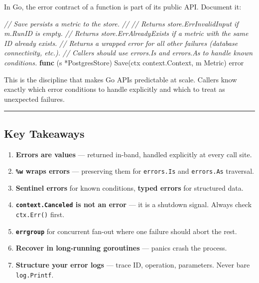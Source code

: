\documentclass[
]{article}
\newenvironment{Shaded}{}{}
\newcommand{\CommentTok}[1]{\textcolor[rgb]{0.38,0.63,0.69}{\textit{#1}}}
\newcommand{\DataTypeTok}[1]{\textcolor[rgb]{0.56,0.13,0.00}{#1}}
\newcommand{\KeywordTok}[1]{\textcolor[rgb]{0.00,0.44,0.13}{\textbf{#1}}}
\newcommand{\NormalTok}[1]{#1}
\newcommand{\OperatorTok}[1]{\textcolor[rgb]{0.40,0.40,0.40}{#1}}
\providecommand{\tightlist}{%
  \setlength{\itemsep}{0pt}\setlength{\parskip}{0pt}}
\begin{document}
In Go, the error contract of a function is part of its public API.
Document it:

\begin{Shaded}
\begin{Highlighting}[]
\CommentTok{// Save persists a metric to the store.}
\CommentTok{//}
\CommentTok{// Returns store.ErrInvalidInput if m.RunID is empty.}
\CommentTok{// Returns store.ErrAlreadyExists if a metric with the same ID already exists.}
\CommentTok{// Returns a wrapped error for all other failures (database connectivity, etc.).}
\CommentTok{// Callers should use errors.Is and errors.As to handle known conditions.}
\KeywordTok{func} \OperatorTok{(}\NormalTok{s }\OperatorTok{*}\NormalTok{PostgresStore}\OperatorTok{)}\NormalTok{ Save}\OperatorTok{(}\NormalTok{ctx context}\OperatorTok{.}\NormalTok{Context}\OperatorTok{,}\NormalTok{ m Metric}\OperatorTok{)} \DataTypeTok{error}
\end{Highlighting}
\end{Shaded}

This is the discipline that makes Go APIs predictable at scale. Callers
know exactly which error conditions to handle explicitly and which to
treat as unexpected failures.

\begin{center}\rule{0.5\linewidth}{0.5pt}\end{center}

\hypertarget{key-takeaways-3}{%
\subsection{Key Takeaways}\label{key-takeaways-3}}

\begin{enumerate}
\def\labelenumi{\arabic{enumi}.}
\tightlist
\item
  \textbf{Errors are values} --- returned in-band, handled explicitly at
  every call site.
\item
  \textbf{\texttt{\%w} wraps errors} --- preserving them for
  \texttt{errors.Is} and \texttt{errors.As} traversal.
\item
  \textbf{Sentinel errors} for known conditions, \textbf{typed errors}
  for structured data.
\item
  \textbf{\texttt{context.Canceled} is not an error} --- it is a
  shutdown signal. Always check \texttt{ctx.Err()} first.
\item
  \textbf{\texttt{errgroup}} for concurrent fan-out where one failure
  should abort the rest.
\item
  \textbf{Recover in long-running goroutines} --- panics crash the
  process.
\item
  \textbf{Structure your error logs} --- trace ID, operation,
  parameters. Never bare \texttt{log.Printf}.
\end{enumerate}
\end{document}
